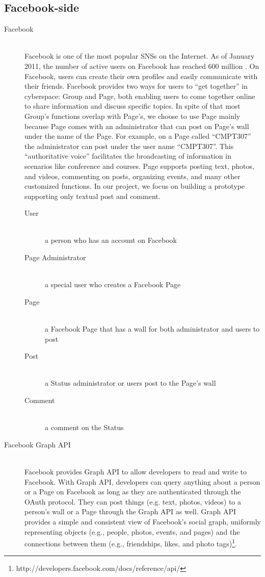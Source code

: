 \subsection{Facebook-side}
\begin{description}
	\item[Facebook] \hfill \\
	Facebook is one of the most popular SNSs on the Internet. As of January 2011, the number of active users on Facebook has reached 600 million \cite{facebook_600m}. On Facebook, users can create their own profiles and easily communicate with their friends. Facebook provides two ways for users to ``get together'' in cyberspace: Group and Page, both enabling users to come together online to share information and discuss specific topics. In spite of that most Group's functions overlap with Page's, we choose to use Page mainly because Page comes with an administrator that can post on Page's wall under the name of the Page. For example, on a Page called ``CMPT307'' the administrator can post under the user name ``CMPT307''. This ``authoritative voice'' facilitates the broadcasting of information in scenarios like conference and courses. Page supports posting text, photos, and videos, commenting on posts, organizing events, and many other customized functions. In our project, we focus on building a prototype supporting only textual post and comment.
	\begin{description}
		\item[User] \hfill \\
		a person who has an account on Facebook
		\item[Page Administrator] \hfill \\
		a special user who creates a Facebook Page
		\item[Page] \hfill \\
		a Facebook Page that has a wall for both administrator and users to post
		\item[Post] \hfill \\
		 a Status administrator or users post to the Page's wall
		\item[Comment] \hfill \\ 
		 a comment on the Status
	\end{description}
	\item[Facebook Graph API] \hfill \\ 
	Facebook provides Graph API to allow developers to read and write to Facebook. With Graph API, developers can query anything about a person or a Page on Facebook as long as they are authenticated through the OAuth protocol. They can post things (e.g. text, photos, videos) to a person's wall or a Page through the Graph API as well. Graph API provides a simple and consistent view of Facebook's social graph, uniformly representing objects (e.g., people, photos, events, and pages) and the connections between them (e.g., friendships, likes, and photo tags)\footnote{http://developers.facebook.com/docs/reference/api/}.
\end{description}

